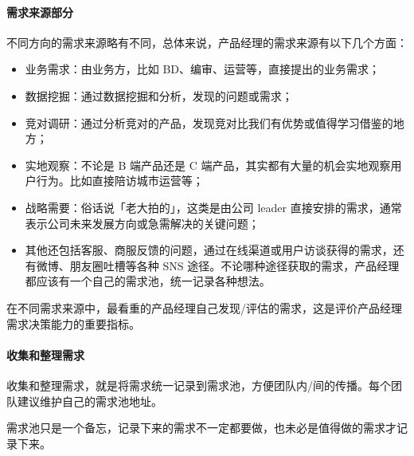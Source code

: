 \documentclass[letterpaper,11pt,english]{sphinxmanual}
\begin{document}
\paragraph{需求来源部分}
\label{\detokenize{chapter_skill/upgrade_manage:id4}}
不同方向的需求来源略有不同，总体来说，产品经理的需求来源有以下几个方面：
\begin{itemize}
\item {} 
业务需求：由业务方，比如 BD、编审、运营等，直接提出的业务需求；

\item {} 
数据挖掘：通过数据挖掘和分析，发现的问题或需求；

\item {} 
竞对调研：通过分析竞对的产品，发现竞对比我们有优势或值得学习借鉴的地方；

\item {} 
实地观察：不论是 B 端产品还是 C
端产品，其实都有大量的机会实地观察用户行为。比如直接陪访城市运营等；

\item {} 
战略需要：俗话说「老大拍的」，这类是由公司 leader
直接安排的需求，通常表示公司未来发展方向或急需解决的关键问题；

\item {} 
其他还包括客服、商服反馈的问题，通过在线渠道或用户访谈获得的需求，还有微博、朋友圈吐槽等各种
SNS
途径。不论哪种途径获取的需求，产品经理都应该有一个自己的需求池，统一记录各种想法。

\end{itemize}

在不同需求来源中，最看重的产品经理自己发现/评估的需求，这是评价产品经理需求决策能力的重要指标。


\paragraph{收集和整理需求}
\label{\detokenize{chapter_skill/upgrade_manage:id5}}
收集和整理需求，就是将需求统一记录到需求池，方便团队内/间的传播。每个团队建议维护自己的需求池地址。

需求池只是一个备忘，记录下来的需求不一定都要做，也未必是值得做的需求才记录下来。
\end{document}
